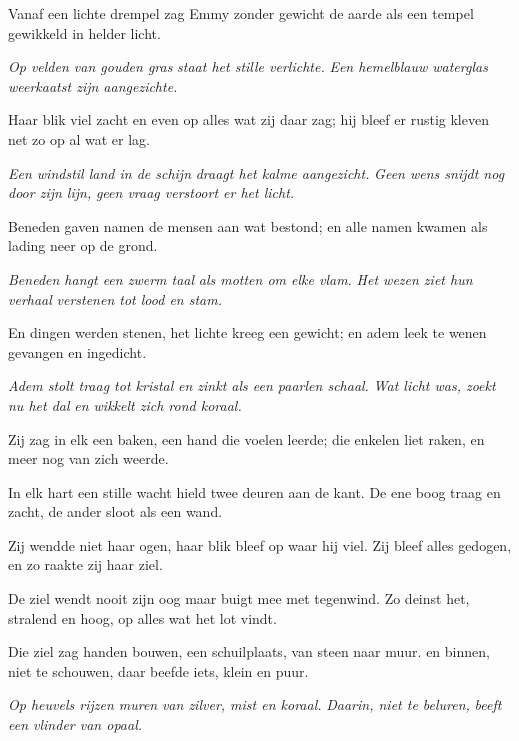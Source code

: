 Vanaf een lichte drempel
zag Emmy zonder gewicht
de aarde als een tempel
gewikkeld in helder licht.

\textit{Op velden van gouden gras}
\textit{staat het stille verlichte.}
\textit{Een hemelblauw waterglas}
\textit{weerkaatst zijn aangezichte.}

Haar blik viel zacht en even
op alles wat zij daar zag;
hij bleef er rustig kleven
net zo op al wat er lag.

\textit{Een windstil land in de schijn}
\textit{draagt het kalme aangezicht.}
\textit{Geen wens snijdt nog door zijn lijn,}
\textit{geen vraag verstoort er het licht.}

Beneden gaven namen
de mensen aan wat bestond;
en alle namen kwamen
als lading neer op de grond.

\textit{Beneden hangt een zwerm taal}
\textit{als motten om elke vlam.}
\textit{Het wezen ziet hun verhaal}
\textit{verstenen tot lood en stam.}

En dingen werden stenen,
het lichte kreeg een gewicht;
en adem leek te wenen
gevangen en ingedicht.

\textit{Adem stolt traag tot kristal}
\textit{en zinkt als een paarlen schaal.}
\textit{Wat licht was, zoekt nu het dal}
\textit{en wikkelt zich rond koraal.}


Zij zag in elk een baken,
een hand die voelen leerde;
die enkelen liet raken,
en meer nog van zich weerde.

In elk hart een stille wacht
hield twee deuren aan de kant.
De ene boog traag en zacht,
de ander sloot als een wand.

Zij wendde niet haar ogen,
haar blik bleef op waar hij viel.
Zij bleef alles gedogen,
en zo raakte zij haar ziel.

De ziel wendt nooit zijn oog
maar buigt mee met tegenwind.
Zo deinst het, stralend en hoog,
op alles wat het lot vindt.

Die ziel zag handen bouwen,
een schuilplaats, van steen naar muur.
en binnen, niet te schouwen,
daar beefde iets, klein en puur.

\textit{Op heuvels rijzen muren}
\textit{van zilver, mist en koraal.}
\textit{Daarin, niet te beluren,}
\textit{beeft een vlinder van opaal.}

